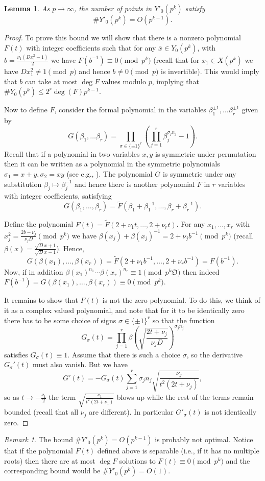 \documentclass[12pt]{amsart}
\newtheorem{lem}{Lemma}[section]
\theoremstyle{definition}
\theoremstyle{remark}
\newtheorem{rem}{Remark}[section]
\numberwithin{equation}{section}
\newcommand{\frakO}{\mathfrak{O}}
\begin{document}
\begin{lem}\label{l:count2}
As $p\to\infty$, the number of points in $Y'_0(p^k)$ satisfy
$$\# Y'_0(p^k)=O(p^{k-1}).$$
\end{lem}
\begin{proof}
To prove this bound we will show that there is a nonzero polynomial
$F(t)$ with integer coefficients such that for any $\bar{x}\in
Y_0(p^k)$, with $b=\frac{\nu_1(Dx_1^2-1)}{2}$ we have
$F(b^{-1})\equiv 0\pmod{p^k}$ (recall that for $x_1\in X(p^k)$ we
have $Dx_1^2\neq 1\pmod{p}$ and hence $b\neq 0\pmod{p}$ is
invertible). This would imply that $b$ can take at most $\deg F$
values modulo $p$, implying that $\# Y_0(p^k)\leq
2^r\deg(F)p^{k-1}$.

Now to define $F$, consider the formal polynomial in the variables
$\beta_1^{\pm 1},\ldots\beta_r^{\pm 1}$ given by
\[G(\beta_1,\ldots\beta_r)=\prod_{\sigma\in\{\pm 1\}^r}\left(\prod_{j=1}^r\beta_j^{\sigma_jn_j}-1\right).\]
Recall that if a polynomial in two variables $x,y$ is symmetric
under permutation then it can be written as a polynomial in the
symmetric polynomials $\sigma_1=x+y,\sigma_2=xy$ (see e.g.,
\cite[Chapter 6]{Bourbaki90}). The polynomial $G$ is symmetric under
any substitution $\beta_j\mapsto\beta_j^{-1}$ and hence there is
another polynomial $\tilde{F}$ in $r$ variables with integer
coefficients, satisfying
 \[G(\beta_1,\ldots,\beta_r)=\tilde{F}(\beta_1+\beta_1^{-1},\ldots,\beta_r+\beta_r^{-1}).\]

Define the polynomial $F(t)=\tilde{F}(2+\nu_1t,\ldots,2+\nu_r t)$.
For any $x_1,\ldots,x_r$ with $x_j^2=\frac{2b-\nu_j}{\nu_j
D}\pmod{p^k}$ we have
$\beta(x_j)+\beta(x_j)^{-1}=2+\nu_jb^{-1}\pmod{p^k}$ (recall
$\beta(x)=\frac{\sqrt{D}x+1}{\sqrt{D}x-1}$). Hence,
\[G(\beta(x_1),\ldots,\beta(x_r))=\tilde{F}(2+\nu_1b^{-1},\ldots,2+\nu_rb^{-1})=F(b^{-1}).\]
Now, if in addition $\beta(x_1)^{n_1}\cdots\beta(x_r)^{n_r}\equiv
1\pmod {p^k\frakO}$ then  indeed
$F(b^{-1})=G(\beta(x_1),\ldots,\beta(x_r))\equiv 0\pmod{p^k}$.

It remains to show that $F(t)$ is not the zero polynomial. To do
this, we think of it as a complex valued polynomial, and note that
for it to be identically zero there has to be some choice of signs
$\sigma\in\{\pm 1\}^r$ so that the function
\[G_\sigma(t)=\prod_{j=1}^r \beta(\sqrt{\frac{2t+\nu_j}{\nu_j D}})^{\sigma_j n_j}\]
satisfies $G_\sigma(t)\equiv1$. Assume that there is such a choice
$\sigma$, so the derivative $G_\sigma'(t)$ must also vanish. But we
have
\[G'(t)=-G_\sigma(t)\sum_{j=1}^r\sigma_jn_j\sqrt{\frac{\nu_j}{t^2(2t+\nu_j)}},\]
so as $t\to-\frac{\nu_1}{2}$ the term
$\sqrt{\frac{\nu_1}{t^2(2t+\nu_1)}}$ blows up while the rest of the
terms remain bounded (recall that all $\nu_j$ are different). In
particular $G'_\sigma(t)$ is not identically zero.
\end{proof}
\begin{rem}
The bound $\# Y'_0(p^k)=O(p^{k-1})$ is probably not optimal. Notice
that if the polynomial $F(t)$ defined above is separable (i.e., if
it has no multiple roots) then there are at most $\deg F$ solutions
to $F(t)\equiv 0\pmod{p^k}$ and the corresponding bound would be $\#
Y'_0(p^k)=O(1)$.
\end{rem}
\end{document}
